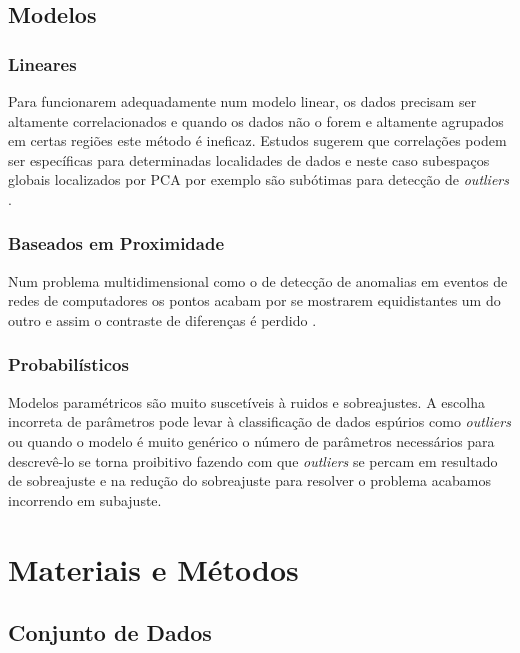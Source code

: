 \documentclass[twoside]{article}
\begin{document}
\subsection{Modelos}

\subsubsection{Lineares}

Para funcionarem adequadamente num modelo linear, os dados precisam ser altamente correlacionados e quando os dados não o forem e altamente agrupados em certas regiões este método é ineficaz. Estudos sugerem que correlações podem ser específicas para determinadas localidades de dados e neste caso subespaços globais localizados por \gls{PCA} por exemplo são subótimas para detecção de \textit{outliers} \cite{aggarwal2000finding}.

\subsubsection{Baseados em Proximidade}

Num problema multidimensional como o de detecção de anomalias em eventos de redes de computadores os pontos acabam por se mostrarem equidistantes um do outro e assim o contraste de diferenças é perdido \cite{aggarwal2001surprising,hinneburg2000nearest}.

\subsubsection{Probabilísticos}

Modelos paramétricos são muito suscetíveis à ruidos e sobreajustes. A escolha incorreta de parâmetros pode levar à classificação de dados espúrios como \textit{outliers} ou quando o modelo é muito genérico o número de parâmetros necessários para descrevê-lo se torna proibitivo fazendo com que \textit{outliers} se percam em resultado de sobreajuste e na redução do sobreajuste para resolver o problema acabamos incorrendo em subajuste.

\section{Materiais e Métodos}

\subsection{Conjunto de Dados}
\end{document}
